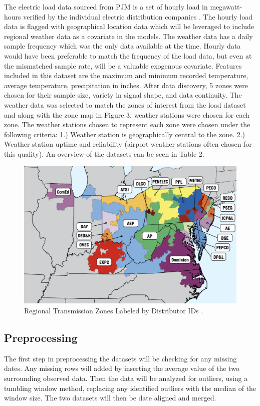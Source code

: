 \documentclass[sigconf]{acmart}
\begin{document}
  The electric load data sourced from PJM is a set of hourly load in megawatt-hours verified by the individual electric distribution companies \cite{PJMLoad24}. The hourly load data is flagged with geographical location data which will be leveraged to include regional weather data as a covariate in the models. 
  The weather data has a daily sample frequency which was the only data available at the time. Hourly data would have been preferable to match the frequency of the load data, but even at the mismatched sample rate, will be a valuable exogenous covariate. Features included in this dataset are the maximum and minimum recorded temperature, average temperature, precipitation in inches. 
  After data discovery, 5 zones were chosen for their sample size, variety in signal shape, and data continuity. The weather data was selected to match the zones of interest from the load dataset and along with the zone map in Figure 3, weather stations were chosen for each zone. The weather stations chosen to represent each zone were chosen under the following criteria: 1.) Weather station is geographically central to the zone. 2.) Weather station uptime and reliability (airport weather stations often chosen for this quality).
  An overview of the datasets can be seen in Table 2.
  
  \begin{figure}
    \includegraphics[width=\columnwidth]{Images/Zones.png}
    \caption{Regional Transmission Zones Labeled by Distributor IDs \protect \cite{PJM24}.}
    \Description{}
    \label{fig:zone}
  \end{figure}

  \subsection{Preprocessing}
  The first step in preprocessing the datasets will be checking for any missing dates. Any missing rows will added by inserting the average value of the two surrounding observed data. Then the data will be analyzed for outliers, using a tumbling window method, replacing any identified outliers with the median of the window size. The two datasets will then be date aligned and merged.
  
\end{document}
